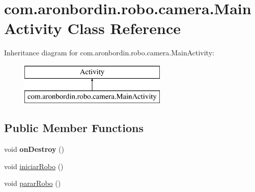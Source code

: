 \hypertarget{classcom_1_1aronbordin_1_1robo_1_1camera_1_1MainActivity}{\section{com.\+aronbordin.\+robo.\+camera.\+Main\+Activity Class Reference}
\label{classcom_1_1aronbordin_1_1robo_1_1camera_1_1MainActivity}
}
Inheritance diagram for com.\+aronbordin.\+robo.\+camera.\+Main\+Activity\+:\begin{figure}[H]
\begin{center}
\leavevmode
\includegraphics[height=2.000000cm]{dd/da1/classcom_1_1aronbordin_1_1robo_1_1camera_1_1MainActivity}
\end{center}
\end{figure}
\subsection*{Public Member Functions}
\begin{DoxyCompactItemize}
\item 
\hypertarget{classcom_1_1aronbordin_1_1robo_1_1camera_1_1MainActivity_aa93ba91edf8ce75af986c2b514dcb2f5}{void {\bfseries on\+Destroy} ()}\label{classcom_1_1aronbordin_1_1robo_1_1camera_1_1MainActivity_aa93ba91edf8ce75af986c2b514dcb2f5}

\item 
void \hyperlink{classcom_1_1aronbordin_1_1robo_1_1camera_1_1MainActivity_a6cf29e225705388ac8f1314d6c7db928}{iniciar\+Robo} ()
\item 
void \hyperlink{classcom_1_1aronbordin_1_1robo_1_1camera_1_1MainActivity_a05fe1bfdbf4e461a6078cf3353a9da83}{parar\+Robo} ()
\end{DoxyCompactItemize}
